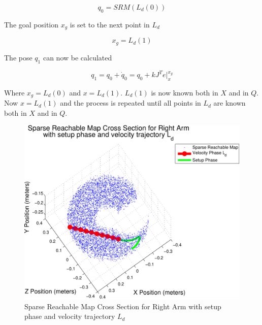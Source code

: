 \begin{equation}
q_0 = SRM  \left( L_d(0) \right)
\end{equation}

The goal position $x_g$ is set to the next point in $L_d$

\begin{equation}
x_g = L_d(1)
\end{equation}

The pose $q_1$ can now be calculated

\begin{equation}
q_1 = q_0 + \dot{q}_0 = q_0 + kJ^Te|_{x}^{x_g}
\end{equation}

Where $x_g = L_d(0)$ and $x = L_d(1)$.  $L_d(1)$ is now known both in $X$ and in $Q$.  Now $x = L_d(1)$ and the process is repeated until all points in $L_d$ are known both in $X$ and in $Q$.




\begin{figure}[thpb]
  \centering
\includegraphics[width=1.0\columnwidth]{./MATLAB/throwTraj3D.pdf}
  \caption{Sparse Reachable Map Cross Section for Right Arm with setup phase and velocity trajectory $L_d$ }
  \label{fig:3dThrowPlot1}
\end{figure}

